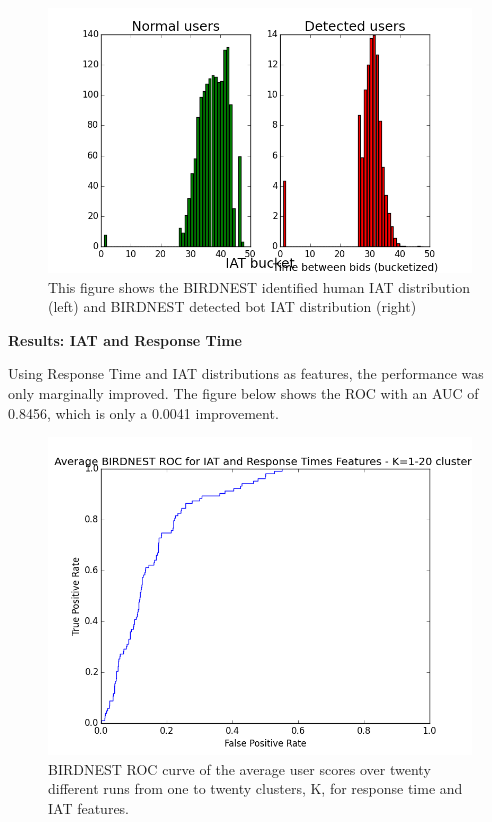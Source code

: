 \documentclass{article} %
\begin{document}

\begin{figure}[h]
\centering
{\caption{This figure shows the BIRDNEST identified human IAT distribution (left) and BIRDNEST detected bot IAT distribution (right)} \includegraphics[scale=0.5]{img/bird_iat_pred.png}}
\end{figure}

\textbf{Results: IAT and Response Time}

Using Response Time and IAT distributions as features, the performance was only marginally improved.
The figure below shows the ROC with an AUC of 0.8456, which is only a 0.0041 improvement.

\begin{figure}[h]
\centering
{\caption{BIRDNEST ROC curve of the average user scores over twenty different runs from one to twenty clusters, K, for response time and IAT features.} \includegraphics[scale=0.47]{img/bird_roc.png}}
\end{figure}
\end{document}
